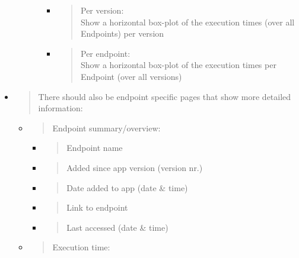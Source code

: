 \begin{itemize}
\begin{itemize}
\begin{itemize}
      \begin{itemize}
      \item
        \begin{quote}
        Per version:\\
        Show a horizontal box-plot of the execution times (over all
        Endpoints) per version
        \end{quote}
      \item
        \begin{quote}
        Per endpoint:\\
        Show a horizontal box-plot of the execution times per Endpoint
        (over all versions)
        \end{quote}
      \end{itemize}
    \end{itemize}
  \end{itemize}
\item
  \begin{quote}
  There should also be endpoint specific pages that show more detailed
  information:
  \end{quote}

  \begin{itemize}
  \item
    \begin{quote}
    Endpoint summary/overview:
    \end{quote}

    \begin{itemize}
    \item
      \begin{quote}
      Endpoint name
      \end{quote}
    \item
      \begin{quote}
      Added since app version (version nr.)
      \end{quote}
    \item
      \begin{quote}
      Date added to app (date \& time)
      \end{quote}
    \item
      \begin{quote}
      Link to endpoint
      \end{quote}
    \item
      \begin{quote}
      Last accessed (date \& time)
      \end{quote}
    \end{itemize}
  \item
    \begin{quote}
    Execution time:
    \end{quote}


\end{itemize}
\end{itemize}
